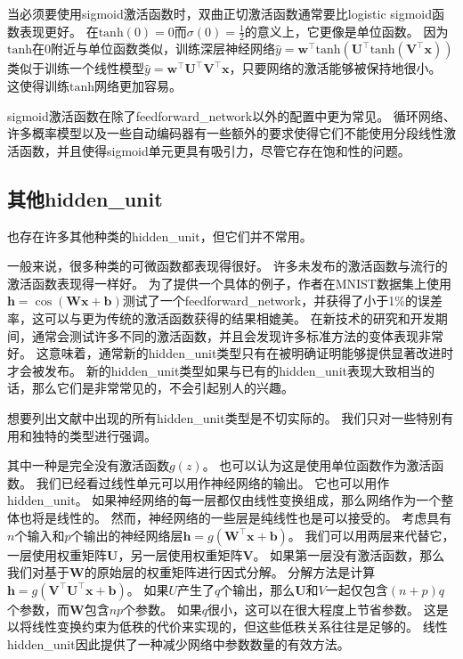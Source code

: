 当必须要使用sigmoid激活函数时，双曲正切激活函数通常要比logistic sigmoid函数表现更好。
在$\text{tanh}(0)=0$而$\sigma(0)=\frac{1}{2}$的意义上，它更像是单位函数。
因为$\text{tanh}$在0附近与单位函数类似，训练深层神经网络$\hat{y}=\bm{w}^\top \text{tanh}(\bm{U}^\top \text{tanh}(\bm{V}^\top \bm{x}))$类似于训练一个线性模型$\hat{y}= \bm{w}^\top \bm{U}^\top \bm{V}^\top \bm{x}$，只要网络的激活能够被保持地很小。
这使得训练$\text{tanh}$网络更加容易。


sigmoid激活函数在除了\gls{feedforward_network}以外的配置中更为常见。
循环网络、许多概率模型以及一些自动编码器有一些额外的要求使得它们不能使用分段线性激活函数，并且使得sigmoid单元更具有吸引力，尽管它存在饱和性的问题。

\subsection{其他\gls{hidden_unit}}
\label{sec:other_hidden_units}

也存在许多其他种类的\gls{hidden_unit}，但它们并不常用。

一般来说，很多种类的可微函数都表现得很好。
许多未发布的激活函数与流行的激活函数表现得一样好。
为了提供一个具体的例子，作者在MNIST数据集上使用$\bm{h}=\cos(\bm{W}\bm{x}+\bm{b})$测试了一个\gls{feedforward_network}，并获得了小于1\%的误差率，这可以与更为传统的激活函数获得的结果相媲美。
在新技术的研究和开发期间，通常会测试许多不同的激活函数，并且会发现许多标准方法的变体表现非常好。
这意味着，通常新的\gls{hidden_unit}类型只有在被明确证明能够提供显著改进时才会被发布。
新的\gls{hidden_unit}类型如果与已有的\gls{hidden_unit}表现大致相当的话，那么它们是非常常见的，不会引起别人的兴趣。

想要列出文献中出现的所有\gls{hidden_unit}类型是不切实际的。
我们只对一些特别有用和独特的类型进行强调。

其中一种是完全没有激活函数$g(z)$。
也可以认为这是使用单位函数作为激活函数。
我们已经看过线性单元可以用作神经网络的输出。
它也可以用作\gls{hidden_unit}。
如果神经网络的每一层都仅由线性变换组成，那么网络作为一个整体也将是线性的。
然而，神经网络的一些层是纯线性也是可以接受的。
考虑具有$n$个输入和$p$个输出的神经网络层$\bm{h}=g(\bm{W}^\top \bm{x}+\bm{b})$。
我们可以用两层来代替它，一层使用权重矩阵$\bm{U}$，另一层使用权重矩阵$\bm{V}$。
如果第一层没有激活函数，那么我们对基于$\bm{W}$的原始层的权重矩阵进行因式分解。
分解方法是计算$\bm{h}=g(\bm{V}^\top \bm{U}^\top \bm{x}+\bm{b})$。
如果$U$产生了$q$个输出，那么$\bm{U}$和$V$一起仅包含$(n+p)q$个参数，而$\bm{W}$包含$np$个参数。
如果$q$很小，这可以在很大程度上节省参数。
这是以将线性变换约束为低秩的代价来实现的，但这些低秩关系往往是足够的。
线性\gls{hidden_unit}因此提供了一种减少网络中参数数量的有效方法。

